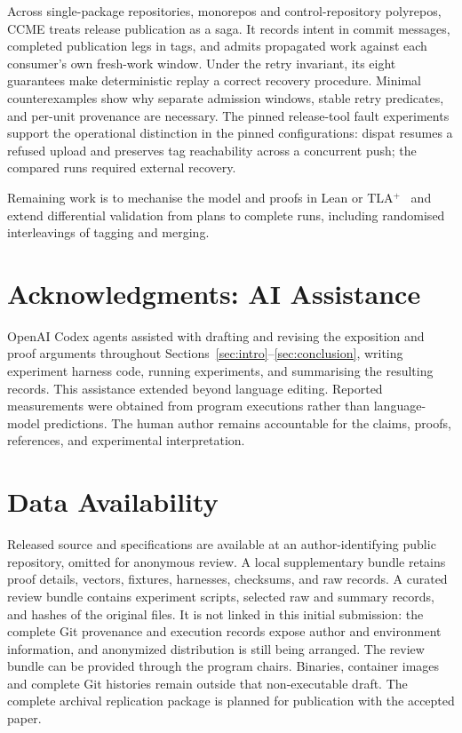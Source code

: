\documentclass[10pt,conference]{IEEEtran}
\theoremstyle{definition}
\begin{document}
Across single-package repositories, monorepos and control-repository polyrepos,
CCME treats release publication as a saga. It records intent in commit
messages, completed publication legs in tags, and admits propagated work
against each consumer's own fresh-work window. Under the retry invariant, its eight
guarantees make deterministic replay a correct recovery procedure.
Minimal counterexamples show why separate admission windows, stable retry
predicates, and per-unit provenance are necessary. The pinned release-tool fault experiments support the operational distinction in the pinned configurations:
dispat resumes a refused upload and preserves tag reachability across a
concurrent push; the compared runs required external recovery.

Remaining work is to mechanise the model and proofs in Lean or
TLA$^{+}$~\cite{lamport} and extend differential validation from plans to
complete runs, including randomised interleavings of tagging and merging.

\section*{Acknowledgments: AI Assistance}
OpenAI Codex agents assisted with drafting and revising the exposition and
proof arguments throughout Sections~\ref{sec:intro}--\ref{sec:conclusion},
writing experiment harness code, running experiments, and summarising the
resulting records. This assistance extended beyond language editing.
Reported measurements were obtained from program executions rather than
language-model predictions. The human author remains accountable for the
claims, proofs, references, and experimental interpretation.

\section*{Data Availability}

Released source and specifications are available at
an author-identifying public repository, omitted for anonymous review.
A local supplementary bundle retains proof details, vectors, fixtures,
harnesses, checksums, and raw records. A curated review bundle contains experiment scripts, selected raw and summary
records, and hashes of the original files. It is not linked in this initial
submission: the complete Git provenance and execution records expose author
and environment information, and anonymized distribution is still being
arranged. The review bundle can be provided through the program chairs.
Binaries, container images and complete Git histories remain outside that
non-executable draft. The complete archival replication package is planned
for publication with the accepted paper.
\end{document}
